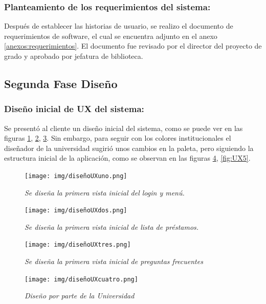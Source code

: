 \documentclass[spanish]{ieee_upb}
\begin{document}
\subsubsection{ Planteamiento de los requerimientos del sistema:}
 Después de establecer las historias de usuario, se realizo el documento de requerimientos de software, el cual se encuentra adjunto en el anexo \ref{anexos:requerimientos}. El documento fue revisado por el director del proyecto de grado y aprobado por jefatura de biblioteca.

\subsection{Segunda Fase Diseño}

\subsubsection{Diseño inicial de UX del sistema:}
 Se presentó al cliente un diseño inicial del sistema, como se puede ver en las figuras \ref{fig:UX1}, \ref{fig:UX2}, \ref{fig:UX3}. Sin embargo, para seguir con los colores institucionales el diseñador de la universidad sugirió unos cambios en la paleta, pero siguiendo la estructura inicial de la aplicación, como se observan en las figuras \ref{fig:UX4}, \ref{fig:UX5}.

 \begin{figure}[H] 
	\centering
	\texttt{[image: img/diseñoUXuno.png]}
	\vspace{-1mm}
	\caption[Diseño inicial de UX Inicio de Sesión y Menú]{\textit{Se diseña la primera vista inicial del login y menú.}}
	\label{fig:UX1} 
\end{figure}

 \begin{figure}[H] 
	\centering
	\texttt{[image: img/diseñoUXdos.png]}
	\vspace{-1mm}
	\caption[Diseño inicial de UX Lista de Préstamos]{\textit{Se diseña la primera vista inicial de lista de préstamos.}}
	\label{fig:UX2} 
\end{figure}

 \begin{figure}[H] 
	\centering
	\texttt{[image: img/diseñoUXtres.png]}
	\vspace{-1mm}
	\caption[Diseño inicial de UX Preguntas Frecuentes]{\textit{Se diseña la primera vista inicial de preguntas frecuentes}}
	\label{fig:UX3} 
\end{figure}

 \begin{figure}[H] 
	\centering
	\texttt{[image: img/diseñoUXcuatro.png]}
	\vspace{-1mm}
	\caption[Diseño inicial de UX diseñador Login, Menú y Preguntas frecuentes]{\textit{Diseño por parte de la Universidad}}
	\label{fig:UX4} 
\end{figure}
\end{document}

